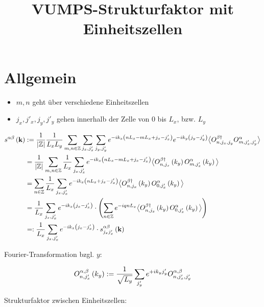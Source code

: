 \documentclass[12pt,paper=a4,BCOR=16mm]{article}
\title{VUMPS-Strukturfaktor mit Einheitszellen}
\begin{document}
\maketitle

\section{Allgemein}

\begin{itemize}
\item $m,n$ geht \"uber verschiedene Einheitszellen
\item $j_x,j'_x,j_y,j'_y$ gehen innerhalb der Zelle von $0$ bis $L_x$, bzw. $L_y$
\end{itemize}

\begin{equation}
\begin{split}
s^{\alpha\beta}\left(\mathbf{k}\right) &:=\frac{1}{\left|\mathbb{Z}\right|}  \frac{1}{L_xL_y} \sum_{m,n\in\mathbb{Z}} \sum_{j_x,j'_x} \sum_{j_y,j'_y} e^{-ik_x\left(nL_x-mL_x+j_x-j'_x\right)} e^{-ik_y\left(j_y-j'_y\right)} \big< O^{\beta\dagger}_{n,j_x,j_y} O^{\alpha}_{m,j'_x,j'_y} \big>\\
                      &= \frac{1}{\left|\mathbb{Z}\right|} \sum_{m,n\in\mathbb{Z}} \frac{1}{L_x} \sum_{j_x,j'_x} e^{-ik_x\left(nL_x-mL_x+j_x-j'_x\right)} \big< O^{\beta\dagger}_{n,j_x}\left(k_y\right) O^{\alpha}_{m,j'_x}\left(k_y\right) \big>\\
                      &= \sum_{n\in\mathbb{Z}} \frac{1}{L_x} \sum_{j_x,j'_x} e^{-ik_x\left(nL_x+j_x-j'_x\right)} \big< O^{\beta\dagger}_{n,j_x}\left(k_y\right) O^{\alpha}_{0,j'_x}\left(k_y\right) \big>\\
                      &= \frac{1}{L_x} \sum_{j_x,j'_x} e^{-ik_x\left(j_x-j'_x\right)} \cdot \left( \sum_{n\in\mathbb{Z}} e^{-iqnL_x} \big< O^{\beta\dagger}_{n,j_x}\left(k_y\right) O^{\alpha}_{0,j'_x}\left(k_y\right) \big> \right)\\
                      &=: \frac{1}{L_x} \sum_{j_x,j'_x} e^{-ik_x\left(j_x-j'_x\right)} \cdot s^{\alpha\beta}_{j_xj'_x}\left(\mathbf{k}\right)
\end{split}
\end{equation}

Fourier-Transformation bzgl. $y$:

\begin{equation}
O^{\alpha,\beta}_{n,j'_x}\left(k_y\right) := \frac{1}{\sqrt{L_y}} \sum_{j'_y} e^{+ik_yj'_y} O^{\alpha,\beta}_{n,j'_x,j'_y}
\end{equation}

Strukturfaktor zwischen Einheitszellen:
\end{document}

